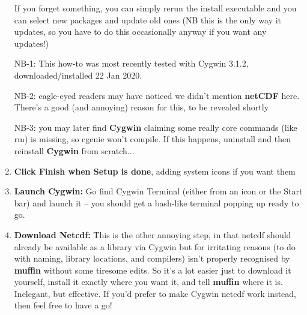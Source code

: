 \documentclass[11pt,fleqn]{book} %
\begin{document}
\begin{enumerate}[noitemsep]
If you forget something, you can simply rerun the install executable
and you can select new packages and update old ones (NB this is the
only way it updates, so you have to do this occasionally anyway if you
want any updates!)

NB-1: This how-to was most recently tested with Cygwin 3.1.2,
downloaded/installed 22 Jan 2020. %

NB-2: eagle-eyed readers may have noticed we didn’t mention
\textbf{netCDF} here. There’s a good (and annoying) reason for this,
to be revealed shortly

NB-3: you may later find \textbf{Cygwin} claiming some really core
commands (like rm) is missing, so cgenie won’t compile. If this
happens, uninstall and then reinstall \textbf{Cygwin} from scratch...

\vspace{2mm}
\item \textbf{Click Finish when Setup is done}, adding system icons if
  you want them

\vspace{2mm}
\item \textbf{Launch Cygwin:} Go find Cygwin Terminal (either from an
  icon or the Start bar) and launch it – you should get a bash-like
  terminal popping up ready to go.

\vspace{2mm}
\item \textbf{Download Netcdf:} This is the other annoying step, in
  that netcdf should already be available as a library via Cygwin but
  for irritating reasons (to do with naming, library locations, and
  compilers) isn’t properly recognised by \textbf{muffin} without some
  tiresome edits. So it’s a lot easier just to download it yourself,
  install it exactly where you want it, and tell \textbf{muffin} where
  it is. Inelegant, but effective. If you’d prefer to make Cygwin
  netcdf work instead, then feel free to have a go!


\end{enumerate}
\end{document}
